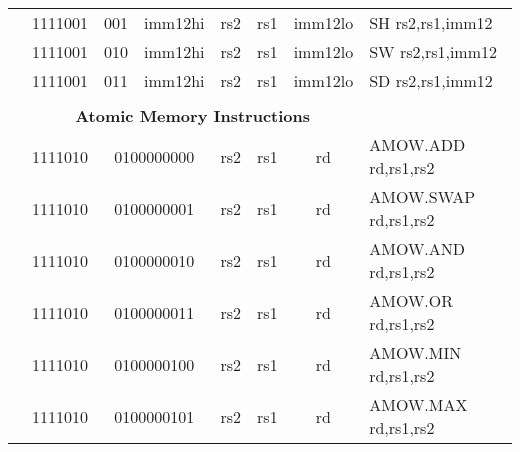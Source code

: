 \begin{table}[p]
\begin{small}
\begin{center}
\begin{tabular}{rcccccccccl}
&
\multicolumn{1}{|c|}{1111001} &
\multicolumn{2}{c|}{001} &
\multicolumn{3}{c|}{imm12hi} &
\multicolumn{1}{c|}{rs2} &
\multicolumn{1}{c|}{rs1} &
\multicolumn{1}{c|}{imm12lo} & SH rs2,rs1,imm12 \\
\cline{2-10}
  

&
\multicolumn{1}{|c|}{1111001} &
\multicolumn{2}{c|}{010} &
\multicolumn{3}{c|}{imm12hi} &
\multicolumn{1}{c|}{rs2} &
\multicolumn{1}{c|}{rs1} &
\multicolumn{1}{c|}{imm12lo} & SW rs2,rs1,imm12 \\
\cline{2-10}
  

&
\multicolumn{1}{|c|}{1111001} &
\multicolumn{2}{c|}{011} &
\multicolumn{3}{c|}{imm12hi} &
\multicolumn{1}{c|}{rs2} &
\multicolumn{1}{c|}{rs1} &
\multicolumn{1}{c|}{imm12lo} & SD rs2,rs1,imm12 \\
\cline{2-10}
  

&
\multicolumn{9}{c}{} & \\
&
\multicolumn{9}{c}{\bf Atomic Memory Instructions} & \\
\cline{2-10}
  

&
\multicolumn{1}{|c|}{1111010} &
\multicolumn{5}{c|}{0100000000} &
\multicolumn{1}{c|}{rs2} &
\multicolumn{1}{c|}{rs1} &
\multicolumn{1}{c|}{rd} & AMOW.ADD rd,rs1,rs2 \\
\cline{2-10}
  

&
\multicolumn{1}{|c|}{1111010} &
\multicolumn{5}{c|}{0100000001} &
\multicolumn{1}{c|}{rs2} &
\multicolumn{1}{c|}{rs1} &
\multicolumn{1}{c|}{rd} & AMOW.SWAP rd,rs1,rs2 \\
\cline{2-10}
  

&
\multicolumn{1}{|c|}{1111010} &
\multicolumn{5}{c|}{0100000010} &
\multicolumn{1}{c|}{rs2} &
\multicolumn{1}{c|}{rs1} &
\multicolumn{1}{c|}{rd} & AMOW.AND rd,rs1,rs2 \\
\cline{2-10}
  

&
\multicolumn{1}{|c|}{1111010} &
\multicolumn{5}{c|}{0100000011} &
\multicolumn{1}{c|}{rs2} &
\multicolumn{1}{c|}{rs1} &
\multicolumn{1}{c|}{rd} & AMOW.OR rd,rs1,rs2 \\
\cline{2-10}
  

&
\multicolumn{1}{|c|}{1111010} &
\multicolumn{5}{c|}{0100000100} &
\multicolumn{1}{c|}{rs2} &
\multicolumn{1}{c|}{rs1} &
\multicolumn{1}{c|}{rd} & AMOW.MIN rd,rs1,rs2 \\
\cline{2-10}
  

&
\multicolumn{1}{|c|}{1111010} &
\multicolumn{5}{c|}{0100000101} &
\multicolumn{1}{c|}{rs2} &
\multicolumn{1}{c|}{rs1} &
\multicolumn{1}{c|}{rd} & AMOW.MAX rd,rs1,rs2 \\
\cline{2-10}
  


\end{tabular}
\end{center}
\end{small}
\end{table}

